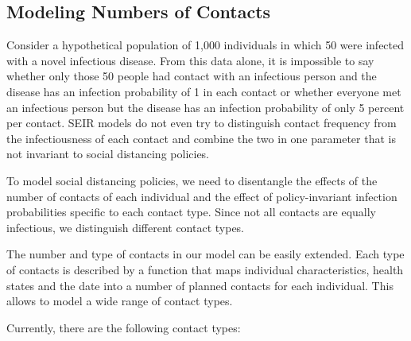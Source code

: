 \subsection{Modeling Numbers of Contacts}
\label{sec:number_of_contacts}

Consider a hypothetical population of 1,000 individuals in which 50 were infected with a novel infectious disease. From this data alone, it is impossible to say whether only those 50 people had contact with an infectious person and the disease has an infection probability of 1 in each contact or whether everyone met an infectious person but the disease has an infection probability of only 5 percent per contact. SEIR models do not even try to distinguish contact frequency from the infectiousness of each contact and combine the two in one parameter that is not invariant to social distancing policies.

To model social distancing policies, we need to disentangle the effects of the number of contacts of each individual and the effect of policy-invariant infection probabilities specific to each contact type. Since not all contacts are equally infectious, we distinguish different contact types.

The number and type of contacts in our model can be easily extended. Each type of contacts is described by a function that maps individual characteristics, health states and the date into a number of planned contacts for each individual. This allows to model a wide range of contact types.

Currently, there are the following contact types:

